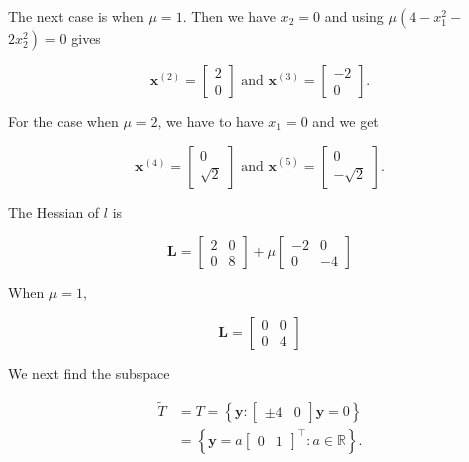The next case is when \(\mu=1\). Then we have \(x_{2}=0\) and using \(\mu\left(4-x_{1}^{2}-\right.\) \(\left.2 x_{2}^{2}\right)=0\) gives

\[
	\boldsymbol{x}^{(2)}=\left[\begin{array}{l}
		2 \\
		0
	\end{array}\right] \text { and } \boldsymbol{x}^{(3)}=\left[\begin{array}{c}
		-2 \\
		0
	\end{array}\right] .
\]

For the case when \(\mu=2\), we have to have \(x_{1}=0\) and we get

\[
	\boldsymbol{x}^{(4)}=\left[\begin{array}{c}
		0 \\
		\sqrt{2}
	\end{array}\right] \text { and } \boldsymbol{x}^{(5)}=\left[\begin{array}{c}
		0 \\
		-\sqrt{2}
	\end{array}\right] .
\]

The Hessian of \(l\) is

\[
	\boldsymbol{L}=\left[\begin{array}{ll}
		2 & 0 \\
		0 & 8
	\end{array}\right]+\mu\left[\begin{array}{cc}
		-2 & 0 \\
		0 & -4
	\end{array}\right]
\]

When \(\mu=1\),

\[
	\boldsymbol{L}=\left[\begin{array}{ll}
		0 & 0 \\
		0 & 4
	\end{array}\right]
\]

We next find the subspace

\[
	\begin{aligned}
		\tilde{T} & =T=\left\{\boldsymbol{y}: \left[\begin{array}{ll} 
			\pm 4 & 0
		\end{array}\right] \boldsymbol{y}=0\right\} \\
		& =\left\{\boldsymbol{y}=a\left[\begin{array}{ll}
			0 & 1
		\end{array}\right]^{\top}: a \in \mathbb{R}\right\} .
	\end{aligned}
\]

